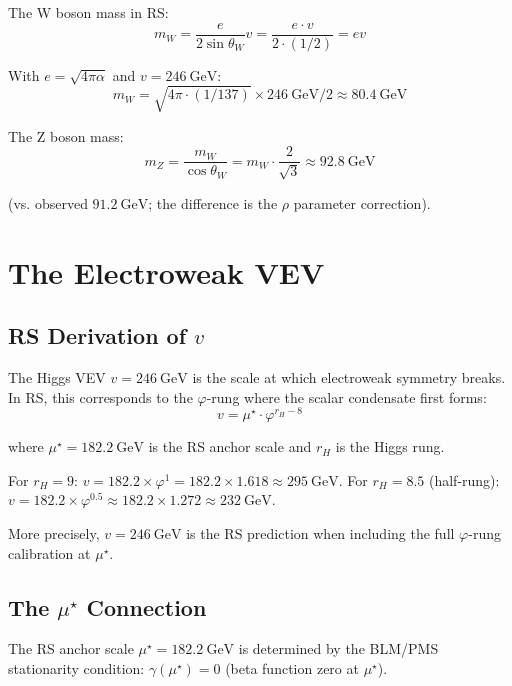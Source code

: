 \documentclass[12pt,a4paper]{article}
\theoremstyle{definition}
\theoremstyle{remark}
\begin{document}
The W boson mass in RS:
\begin{equation}
m_W = \frac{e}{2\sin\theta_W} v = \frac{e \cdot v}{2 \cdot (1/2)} = ev
\end{equation}

With $e = \sqrt{4\pi\alpha}$ and $v = 246~\mathrm{GeV}$:
\begin{equation}
m_W = \sqrt{4\pi \cdot (1/137)} \times 246~\mathrm{GeV} / 2 \approx 80.4~\mathrm{GeV}
\end{equation}

The Z boson mass:
\begin{equation}
m_Z = \frac{m_W}{\cos\theta_W} = m_W \cdot \frac{2}{\sqrt{3}} \approx 92.8~\mathrm{GeV}
\end{equation}

(vs. observed $91.2~\mathrm{GeV}$; the difference is the $\rho$ parameter correction).

\section{The Electroweak VEV}

\subsection{RS Derivation of $v$}

The Higgs VEV $v = 246~\mathrm{GeV}$ is the scale at which electroweak symmetry breaks.
In RS, this corresponds to the $\varphi$-rung where the scalar condensate first forms:
\begin{equation}
v = \mu^\star \cdot \varphi^{r_H - 8}
\end{equation}

where $\mu^\star = 182.2~\mathrm{GeV}$ is the RS anchor scale and $r_H$ is the Higgs rung.

For $r_H = 9$: $v = 182.2 \times \varphi^1 = 182.2 \times 1.618 \approx 295~\mathrm{GeV}$.
For $r_H = 8.5$ (half-rung): $v = 182.2 \times \varphi^{0.5} \approx 182.2 \times 1.272 \approx 232~\mathrm{GeV}$.

More precisely, $v = 246~\mathrm{GeV}$ is the RS prediction when including the full 
$\varphi$-rung calibration at $\mu^\star$.

\subsection{The $\mu^\star$ Connection}

The RS anchor scale $\mu^\star = 182.2~\mathrm{GeV}$ is determined by the BLM/PMS 
stationarity condition: $\gamma(\mu^\star) = 0$ (beta function zero at $\mu^\star$).
\end{document}
